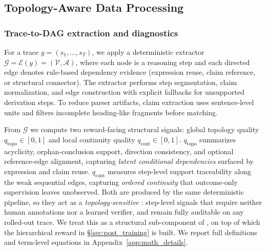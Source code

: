 \subsection{Topology-Aware Data Processing}
\label{sec:reward_module}

\subsubsection{Trace-to-DAG extraction and diagnostics}
For a trace $y=(s_1,\ldots,s_T)$, we apply a deterministic extractor
$\mathcal{G}=\mathcal{E}(y)=(\mathcal{V},\mathcal{A})$, where each node is a reasoning step and each directed edge denotes rule-based dependency evidence (expression reuse, claim reference, or structural connector).
The extractor performs step segmentation, claim normalization, and edge construction with explicit fallbacks for unsupported derivation steps.
To reduce parser artifacts, claim extraction uses sentence-level units and filters incomplete heading-like fragments before matching.

From $\mathcal{G}$ we compute two reward-facing structural signals:
global topology quality $q_{\mathrm{topo}}\in[0,1]$ and local continuity quality $q_{\mathrm{cont}}\in[0,1]$.
$q_{\mathrm{topo}}$ summarizes acyclicity, orphan-conclusion support, direction consistency, and optional reference-edge alignment, capturing \emph{latent conditional dependencies} surfaced by expression and claim reuse.
$q_{\mathrm{cont}}$ measures step-level support traceability along the weak sequential edges, capturing \emph{ordered continuity} that outcome-only supervision leaves unobserved.
Both are produced by the same deterministic pipeline, so they act as a \emph{topology-sensitive \prm}: step-level signals that require neither human annotations nor a learned verifier, and remain fully auditable on any rolled-out trace. We treat this \prm as a structural sub-component of \method, on top of which the hierarchical reward in \S\ref{sec:post_training} is built.
We report full definitions and term-level equations in Appendix~\ref{app:math_details}.


